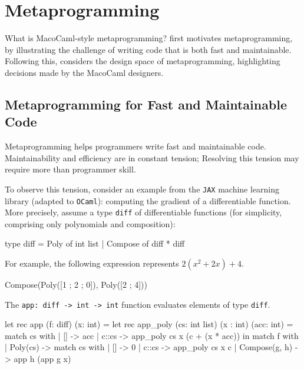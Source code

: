 \section{Metaprogramming}\label{section:metaprogramming-technical}
What is MacoCaml-style metaprogramming?  first motivates metaprogramming, by illustrating the challenge of writing code that is both fast and maintainable. Following this,  considers the design space of metaprogramming, highlighting decisions made by the MacoCaml designers.

\subsection{Metaprogramming for Fast and Maintainable Code}\label{subsection:metaprogramming-motivation}

Metaprogramming helps programmers write fast and maintainable code. Maintainability and efficiency are in constant tension; Resolving this tension may require more than programmer skill. 

To observe this tension, consider an example from the \texttt{JAX} machine learning library (adapted to \texttt{OCaml}): computing the gradient of a differentiable function. More precisely, assume a type \texttt{diff} of differentiable functions (for simplicity, comprising only polynomials and composition):

\begin{ocaml}
type diff = Poly of int list 
          | Compose of diff * diff
\end{ocaml}
For example, the following expression represents $2(x^2 + 2x) + 4$. 
\begin{ocaml}
Compose(Poly([1 ; 2 ; 0]), Poly([2 ; 4]))
\end{ocaml}

The \texttt{app: diff -> int -> int} function evaluates elements of type \texttt{diff}. 

\begin{ocaml}
let rec app (f: diff) (x: int) = 
  let rec app_poly (cs: int list) (x : int) (acc: int) = match cs with 
    | [] -> acc 
    | c::cs -> app_poly cs x (c + (x * acc)) 
  in match f with 
    | Poly(cs)      -> match cs with 
                      | [] -> 0
                      | c::cs -> app_poly cs x c
    | Compose(g, h) -> app h (app g x)
\end{ocaml}

